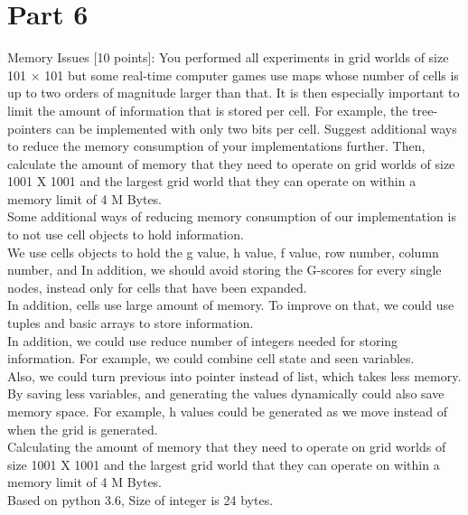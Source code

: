 \documentclass[preprint,12pt,3p]{elsarticle}
\begin{document}
\section{Part 6}
\label{sec6}

Memory Issues [10 points]: You performed all experiments in grid worlds of size 101 × 101 but some real-time computer games use maps whose number of cells is up to two orders of magnitude larger than that. It is then especially important to limit the amount of information that is stored per cell. For example, the tree-pointers can be implemented with only two bits per cell. Suggest additional ways to reduce the memory consumption of your implementations further. Then, calculate the amount of memory that they need to operate on grid worlds of size 1001 X 1001 and the largest grid world that they can operate on within a memory limit of 4 M Bytes.\\

Some additional ways of reducing memory consumption of our implementation is to not use cell objects to hold information.\\

We use cells objects to hold the g value, h value, f value, row number, column number, and In addition, we should avoid storing the G-scores for every single nodes, instead only for cells that have been expanded.\\

In addition, cells use large amount of memory. To improve on that, we could use tuples and basic arrays to store information.\\

In addition, we could use reduce number of integers needed for storing information. For example, we could combine cell state and seen variables.\\ 

Also, we could turn previous into pointer instead of list, which takes less memory. By saving less variables, and generating the values dynamically could also save memory space. For example, h values could be generated as we move instead of when the grid is generated.\\

Calculating the amount of memory that they need to operate on grid worlds of size 1001 X 1001 and the largest grid world that they can operate on within a memory limit of 4 M Bytes.\\

Based on python 3.6, Size of integer is 24 bytes.\\
\end{document}
